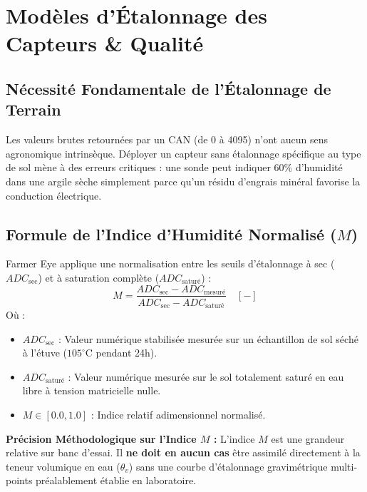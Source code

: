 \documentclass[11pt,a4paper,oneside]{report}
\begin{document}
\chapter{Modèles d'Étalonnage des Capteurs \& Qualité}

\section{Nécessité Fondamentale de l'Étalonnage de Terrain}
Les valeurs brutes retournées par un CAN (de 0 à 4095) n'ont aucun sens agronomique intrinsèque. Déployer un capteur sans étalonnage spécifique au type de sol mène à des erreurs critiques : une sonde peut indiquer 60\% d'humidité dans une argile sèche simplement parce qu'un résidu d'engrais minéral favorise la conduction électrique.

\section{Formule de l'Indice d'Humidité Normalisé ($M$)}
Farmer Eye applique une normalisation entre les seuils d'étalonnage à sec ($ADC_{\text{sec}}$) et à saturation complète ($ADC_{\text{saturé}}$) :
\begin{equation}
M = \frac{ADC_{\text{sec}} - ADC_{\text{mesuré}}}{ADC_{\text{sec}} - ADC_{\text{saturé}}} \quad [-]
\end{equation}
Où :
\begin{itemize}[leftmargin=*]
    \item $ADC_{\text{sec}}$ : Valeur numérique stabilisée mesurée sur un échantillon de sol séché à l'étuve ($105^\circ\text{C}$ pendant 24h).
    \item $ADC_{\text{saturé}}$ : Valeur numérique mesurée sur le sol totalement saturé en eau libre à tension matricielle nulle.
    \item $M \in [0.0, 1.0]$ : Indice relatif adimensionnel normalisé.
\end{itemize}

\begin{warningbox}
\textbf{Précision Méthodologique sur l'Indice $M$ :} L'indice $M$ est une grandeur relative sur banc d'essai. Il \textbf{ne doit en aucun cas} être assimilé directement à la teneur volumique en eau ($\theta_v$) sans une courbe d'étalonnage gravimétrique multi-points préalablement établie en laboratoire.
\end{warningbox}
\end{document}
